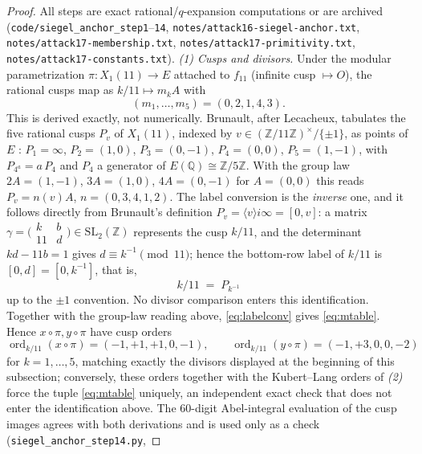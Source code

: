 \documentclass[11pt]{amsart}
\theoremstyle{definition}
\theoremstyle{remark}
\newcommand{\Q}{\mathbb{Q}}
\newcommand{\Z}{\mathbb{Z}}
\begin{document}
\begin{proof}
All steps are exact rational/$q$-expansion computations or are archived
(\texttt{code/siegel\_anchor\_step1}--\texttt{14},
\texttt{notes/attack16-siegel-anchor.txt},
\texttt{notes/attack17-membership.txt},
\texttt{notes/attack17-primitivity.txt},
\texttt{notes/attack17-constants.txt}).
\emph{(1) Cusps and divisors.}  Under the modular parametrization
$\pi\colon X_1(11)\to E$ attached to $f_{11}$ (infinite cusp $\mapsto O$),
the rational cusps map as $k/11\mapsto m_kA$ with
\begin{equation}\label{eq:mtable}
  (m_1,\dots,m_5)=(0,2,1,4,3).
\end{equation}
This is derived exactly, not numerically.  Brunault, after Lecacheux,
tabulates the five rational cusps $P_v$ of $X_1(11)$, indexed by
$v\in(\Z/11\Z)^\times/\{\pm1\}$, as points of $E$
\cite[(3.152)--(3.153)]{Brunault}: $P_1=\infty$, $P_2=(1,0)$,
$P_3=(0,-1)$, $P_4=(0,0)$, $P_5=(1,-1)$, with $P_{4^a}=a\,P_4$ and $P_4$
a generator of $E(\Q)\cong\Z/5\Z$.  With the group law $2A=(1,-1)$,
$3A=(1,0)$, $4A=(0,-1)$ for $A=(0,0)$ this reads $P_v=n(v)A$,
$n=(0,3,4,1,2)$.  The label conversion is the \emph{inverse} one, and it
follows directly from Brunault's definition
$P_v=\langle v\rangle i\infty=[0,v]$: a matrix
$\gamma=\bigl(\begin{smallmatrix}k&b\\11&d\end{smallmatrix}\bigr)
 \in\mathrm{SL}_2(\Z)$
represents the cusp $k/11$, and the determinant $kd-11b=1$ gives
$d\equiv k^{-1}\pmod{11}$; hence the bottom-row label of $k/11$ is
$[0,d]=[0,k^{-1}]$, that is,
\begin{equation}\label{eq:labelconv}
  k/11 \;=\; P_{k^{-1}}
\end{equation}
up to the $\pm1$ convention.  No divisor comparison enters this
identification.  Together with the group-law reading above,
\eqref{eq:labelconv} gives \eqref{eq:mtable}.  Hence
$x\circ\pi,y\circ\pi$ have cusp orders
\[
  \operatorname{ord}_{k/11}(x\circ\pi)=(-1,+1,+1,0,-1),\qquad
  \operatorname{ord}_{k/11}(y\circ\pi)=(-1,+3,0,0,-2)
\]
for $k=1,\dots,5$, matching exactly the divisors displayed at the
beginning of this subsection; conversely, these orders together with the
Kubert--Lang orders of \emph{(2)} force the tuple \eqref{eq:mtable}
uniquely, an independent exact check that does not enter the
identification above.  The $60$-digit Abel-integral
evaluation of the cusp images agrees with both derivations and is used
only as a check (\texttt{siegel\_anchor\_step14.py},

\end{proof}
\end{document}
